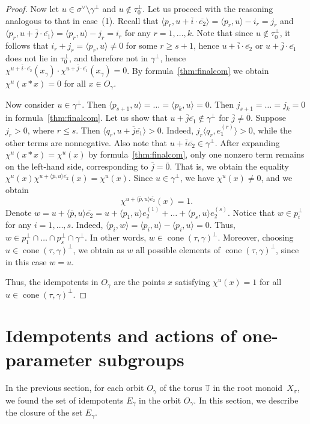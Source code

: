 \documentclass[a4paper, 11pt]{amsart}
\theoremstyle{plain}
\theoremstyle{remark}
\theoremstyle{definition}
\newcommand{\TT}{\mathbb{T}}
\newcommand{\ol}[1]{\overline{#1}}
\DeclareMathOperator{\cone}{cone}
\begin{document}
\begin{proof}
Now let $u \in \sigma^\vee \setminus \gamma^\perp$ and $u \notin \tau_0^\perp$. Let us proceed with the reasoning analogous to that in case~(1). Recall that $\langle p_r, u + \ol{i}\cdot \ol{e_2} \rangle = \langle p_r, u \rangle - i_r = j_r$ and $\langle p_r, u + \ol{j}\cdot \ol{e_1} \rangle = \langle p_r, u \rangle - j_r = i_r$ for any $r = 1, \ldots, k$. Note that since $u \notin \tau_0^\perp$, it follows that $i_r + j_r = \langle p_r, u \rangle \neq 0$ for some $r \geq s+1$, hence $u + \ol{i}\cdot \ol{e_2}$ or $u + \ol{j}\cdot \ol{e_1}$ does not lie in $\tau_0^\perp$, and therefore not in $\gamma^\perp$, hence $\chi^{u + \ol{i}\cdot \ol{e_2}}(x_\gamma) \cdot \chi^{u + \ol{j}\cdot \ol{e_1}}(x_\gamma) = 0$. By formula~\eqref{thm:finalcom} we obtain $\chi^u(x*x) = 0$ for all $x \in O_\gamma$.

Now consider $u \in \gamma^\perp$. Then $\langle p_{s+1}, u \rangle = \ldots = \langle p_{k}, u \rangle = 0$. Then $j_{s+1} = \ldots = j_k = 0$ in formula~\eqref{thm:finalcom}. Let us show that $u + \ol{j} \ol{e_1} \notin \gamma^\perp$ for $\ol{j} \neq \ol{0}$. Suppose $j_r > 0$, where $r \leq s$. Then $\langle q_r, u + \ol{j} \ol{e_1} \rangle > 0$. Indeed, $j_r \langle q_r, e_1^{(r)} \rangle > 0$, while the other terms are nonnegative. Also note that $u + \ol{i} \ol{e_2} \in \gamma^\perp$. After expanding $\chi^u(x*x) = \chi^u(x)$ by formula~\eqref{thm:finalcom}, only one nonzero term remains on the left-hand side, corresponding to $\ol{j} = \ol{0}$. That is, we obtain the equality $\chi^u(x)\chi^{u + \langle \ol{p}, u \rangle \ol{e_2}}(x) = \chi^u(x)$. Since $u \in \gamma^\perp$, we have $\chi^u(x) \neq 0$, and we obtain $$\chi^{u + \langle \ol{p}, u \rangle \ol{e_2}}(x) = 1.$$ Denote $w = u + \langle \ol{p}, u \rangle \ol{e_2} = u + \langle p_1, u \rangle e_2^{(1)} + \ldots + \langle p_s, u \rangle e_2^{(s)}$. Notice that $w \in p_i^\perp$ for any $i = 1, \ldots, s$. Indeed, $\langle p_i, w \rangle = \langle p_i, u \rangle - \langle p_i, u \rangle = 0$. Thus, $w \in p_1^\perp \cap \ldots \cap p_s^\perp \cap \gamma^\perp$. In other words, $w \in \cone(\tau, \gamma)^\perp$. Moreover, choosing $u \in \cone(\tau, \gamma)^\perp$, we obtain as $w$ all possible elements of $\cone(\tau, \gamma)^\perp$, since in this case $w = u$.

Thus, the idempotents in $O_\gamma$ are the points $x$ satisfying $\chi^u(x) = 1$ for all $u \in \cone(\tau, \gamma)^\perp$.
\end{proof}

\section{Idempotents and actions of one-parameter subgroups} \label{sec:idemp_geom}
In the previous section, for each orbit $O_\gamma$ of the torus $\TT$ in the root monoid~$X_\sigma$, we found the set of idempotents $E_\gamma$ in the orbit $O_\gamma$. In this section, we describe the closure of the set $E_\gamma$. 
\end{document}
